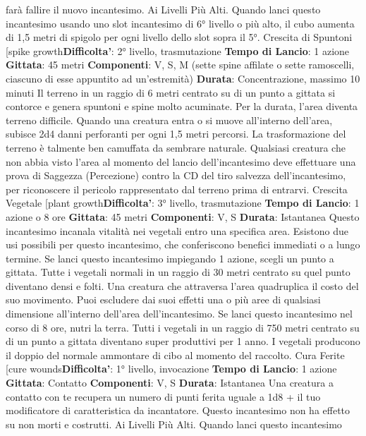 \begin{multicols}{2}
farà fallire il nuovo incantesimo.
Ai Livelli Più Alti. Quando lanci questo incantesimo
usando uno slot incantesimo di 6° livello o più alto, il
cubo aumenta di 1,5 metri di spigolo per ogni livello
dello slot sopra il 5°.
Crescita di Spuntoni
[spike growth\textbf{Difficolta'}:
2° livello, trasmutazione
\textbf{Tempo di Lancio}: 1 azione
\textbf{Gittata}: 45 metri
\textbf{Componenti}: V, S, M (sette spine affilate o sette
ramoscelli, ciascuno di esse appuntito ad un’estremità)
\textbf{Durata}: Concentrazione, massimo 10 minuti
Il terreno in un raggio di 6 metri centrato su di un punto
a gittata si contorce e genera spuntoni e spine molto
acuminate. Per la durata, l’area diventa terreno difficile.
Quando una creatura entra o si muove all’interno
dell’area, subisce 2d4 danni perforanti per ogni 1,5
metri percorsi.
La trasformazione del terreno è talmente ben camuffata
da sembrare naturale. Qualsiasi creatura che non abbia
visto l’area al momento del lancio dell’incantesimo deve
effettuare una prova di Saggezza (Percezione) contro la
CD del tiro salvezza dell’incantesimo, per riconoscere il
pericolo rappresentato dal terreno prima di entrarvi.
Crescita Vegetale
[plant growth\textbf{Difficolta'}:
3° livello, trasmutazione
\textbf{Tempo di Lancio}: 1 azione o 8 ore
\textbf{Gittata}: 45 metri
\textbf{Componenti}: V, S
\textbf{Durata}: Istantanea
Questo incantesimo incanala vitalità nei vegetali entro
una specifica area. Esistono due usi possibili per
questo incantesimo, che conferiscono benefici
immediati o a lungo termine.
Se lanci questo incantesimo impiegando 1 azione,
scegli un punto a gittata. Tutte i vegetali normali in un 
raggio di 30 metri centrato su quel punto diventano
densi e folti. Una creatura che attraversa l’area
quadruplica il costo del suo movimento.
Puoi escludere dai suoi effetti una o più aree di
qualsiasi dimensione all’interno dell’area
dell’incantesimo.
Se lanci questo incantesimo nel corso di 8 ore, nutri la
terra. Tutti i vegetali in un raggio di 750 metri centrato
su di un punto a gittata diventano super produttivi per 1
anno. I vegetali producono il doppio del normale
ammontare di cibo al momento del raccolto.
Cura Ferite
[cure wounds\textbf{Difficolta'}:
1° livello, invocazione
\textbf{Tempo di Lancio}: 1 azione
\textbf{Gittata}: Contatto
\textbf{Componenti}: V, S
\textbf{Durata}: Istantanea
Una creatura a contatto con te recupera un numero di
punti ferita uguale a 1d8 + il tuo modificatore di
caratteristica da incantatore. Questo incantesimo non
ha effetto su non morti e costrutti.
Ai Livelli Più Alti. Quando lanci questo incantesimo

\end{multicols}
